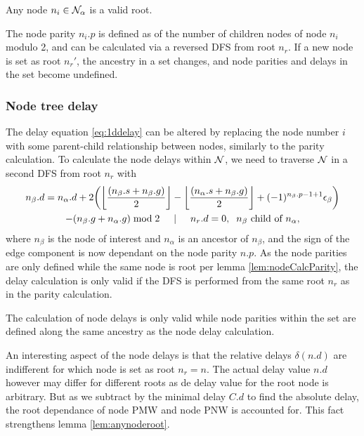 \begin{lemma}\label{lem:anynoderoot}
  Any node $n_i \in \mathcal{N}_\alpha$ is a valid root.
\end{lemma}

\begin{lemma}\label{lem:nodeCalcParity}
  The node parity $n_i.p$ is defined as of the number of children nodes of node $n_i$ modulo 2, and can be calculated via a reversed DFS from root $n_r$. If a new node is set as root $n_r'$, the ancestry in a set changes, and node parities and delays in the set become undefined.
\end{lemma}

\subsubsection{Node tree delay}

The delay equation \ref{eq:1ddelay} can be altered by replacing the node number $i$ with some parent-child relationship between nodes, similarly to the parity calculation. To calculate the node delays within $\mathcal{N}$, we need to traverse $\mathcal{N}$ in a second DFS from root $n_r$ with
\begin{multline}\label{eq:2ddelay}
  n_\beta.d = n_\alpha.d + 2\bigg({\left \lfloor \frac{(n_\beta.s+n_\beta.g)}{2} \right \rfloor } - {\left \lfloor \frac{(n_\alpha.s+n_\beta.g)}{2} \right \rfloor } + (-1)^{n_\beta.p-1+1}\epsilon_\beta\bigg) \\
         - (n_\beta.g + n_\alpha.g)\bmod 2 \hspace{.5cm} | \hspace{.5cm} n_r.d = 0, \hspace{.2cm} n_\beta \mbox{ child of } n_\alpha,
\end{multline}
where $n_\beta$ is the node of interest and $n_\alpha$ is an ancestor of $n_\beta$, and the sign of the edge component is now dependant on the node parity $n.p$. As the node parities are only defined while the same node is root per lemma \ref{lem:nodeCalcParity}, the delay calculation is only valid if the DFS is performed from the same root $n_r$ as in the parity calculation.

\begin{lemma}\label{lem:nodecalc_ancestrypath}
 The calculation of node delays is only valid while node parities within the set are defined along the same ancestry as the node delay calculation.
\end{lemma}

An interesting aspect of the node delays is that the relative delays $\delta(n.d)$ are indifferent for which node is set as root $n_r = n$. The actual delay value $n.d$ however may differ for different roots as de delay value for the root node is arbitrary. But as we subtract by the minimal delay $C.d$ to find the absolute delay, the root dependance of node PMW and node PNW is accounted for. This fact strengthens lemma \ref{lem:anynoderoot}.

